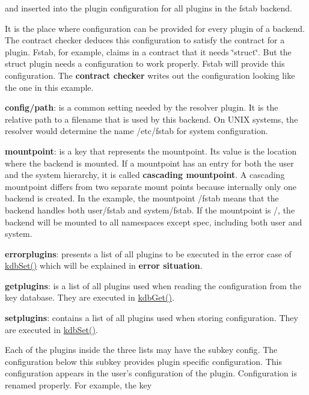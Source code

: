 and inserted into the plugin configuration for all plugins in the {\ttfamily fstab} backend.

It is the place where configuration can be provided for every plugin of a backend. The contract checker deduces this configuration to satisfy the contract for a plugin. Fstab, for example, claims in a contract that it needs \char`\"{}struct\char`\"{}. But the struct plugin needs a configuration to work properly. Fstab will provide this configuration. The {\bfseries contract checker} writes out the configuration looking like the one in this example.


\begin{DoxyItemize}
\item {\bfseries config/path}\+: is a common setting needed by the resolver plugin. It is the relative path to a filename that is used by this backend. On U\+N\+I\+X systems, the resolver would determine the name {\ttfamily /etc/fstab} for system configuration.
\item {\bfseries mountpoint}\+: is a key that represents the mountpoint. Its value is the location where the backend is mounted. If a mountpoint has an entry for both the user and the system hierarchy, it is called {\bfseries cascading mountpoint}. A cascading mountpoint differs from two separate mount points because internally only one backend is created. In the example, the mountpoint {\ttfamily /fstab} means that the backend handles both {\ttfamily user/fstab} and {\ttfamily system/fstab}. If the mountpoint is {\ttfamily /}, the backend will be mounted to all namespaces except {\ttfamily spec}, including both {\ttfamily user} and {\ttfamily system}.
\item {\bfseries errorplugins}\+: presents a list of all plugins to be executed in the error case of {\ttfamily \hyperlink{group__kdb_ga11436b058408f83d303ca5e996832bcf}{kdb\+Set()}} which will be explained in {\bfseries error situation}.
\item {\bfseries getplugins}\+: is a list of all plugins used when reading the configuration from the key database. They are executed in {\ttfamily \hyperlink{group__kdb_ga28e385fd9cb7ccfe0b2f1ed2f62453a1}{kdb\+Get()}}.
\item {\bfseries setplugins}\+: contains a list of all plugins used when storing configuration. They are executed in {\ttfamily \hyperlink{group__kdb_ga11436b058408f83d303ca5e996832bcf}{kdb\+Set()}}.
\end{DoxyItemize}

Each of the plugins inside the three lists may have the subkey {\ttfamily config}. The configuration below this subkey provides plugin specific configuration. This configuration appears in the user's configuration of the plugin. Configuration is renamed properly. For example, the key 


